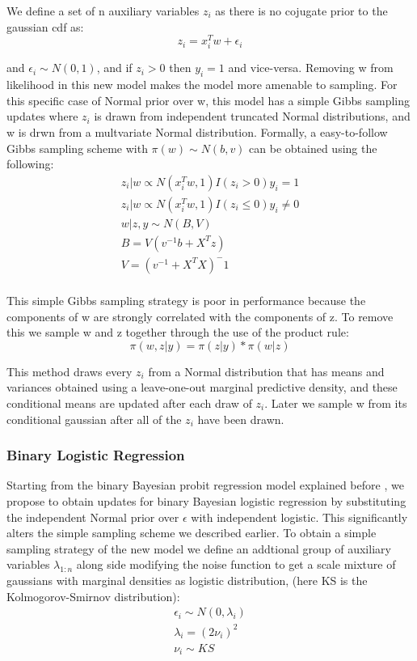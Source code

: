 We define a set of n auxiliary variables $z_i$ as there is no cojugate prior to
the gaussian cdf as:
\begin{equation}
z_i=x_i^Tw+\epsilon_i
\end{equation}

and $\epsilon_i \sim N(0,1)$, and if $z_i>0$ then $y_i=1$ and vice-versa.
Removing w from likelihood in this new model makes the model more amenable
to sampling. For this
specific case of  Normal prior over w, this model has a simple
Gibbs sampling updates where $z_i$ is drawn from independent 
truncated Normal distributions, and w is drwn from a multvariate Normal
distribution. Formally, a easy-to-follow Gibbs sampling scheme with
$\pi(w)\sim N(b,v)$ can be obtained using the following:
\begin{eqnarray}
z_i|w \propto N(x_i^Tw,1)I(z_i>0)y_i=1 \\
z_i|w \propto N(x_i^Tw,1)I(z_i\leq 0)y_i\neq 0 \\
w|z,y \sim N(B,V) \\
B = V(v^{-1}b+X^Tz) \\
V=(v^{-1}+X^TX)^-1 \\
\end{eqnarray}

This simple Gibbs sampling strategy is poor in performance because the
components of w are strongly correlated with the components of z. To remove this
we sample w and z together through the use of the product rule:
\begin{equation}
\pi(w,z|y) = \pi(z|y)*\pi(w|z)
\end{equation}

This method draws every $z_i$ from a Normal distribution that has means
and variances obtained using a leave-one-out marginal predictive density,
and these conditional means are updated after each draw of $z_i$.
Later we sample w from its conditional gaussian after all of the
$z_i$ have been drawn. 



\subsubsection{Binary Logistic Regression}
Starting from the binary Bayesian probit regression model explained before , we
propose to obtain updates for binary Bayesian logistic regression by
substituting the independent Normal 
prior over $\epsilon$ with independent logistic. 
This significantly alters the simple sampling scheme we described earlier. To
obtain a simple sampling strategy of the new model we define an addtional group
of auxiliary variables $λ_{1:n}$ along side modifying the noise function to get
a scale mixture of gaussians with marginal densities as logistic distribution,
(here KS is the Kolmogorov-Smirnov distribution):
\begin{eqnarray}
\epsilon_i \sim N(0,\lambda_i) \\
\lambda_i = (2\nu_i)^2 \\
\nu_i \sim KS \\
\end{eqnarray}


